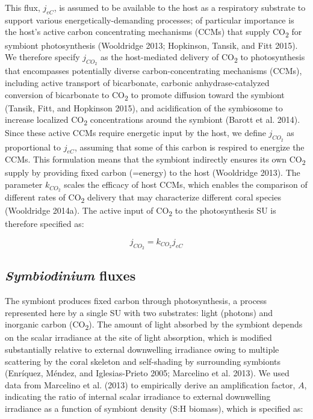 \documentclass[]{elsarticle} %
\begin{document}
This flux, \(j_{eC}\), is assumed to be available to the host as a
respiratory substrate to support various energetically-demanding
processes; of particular importance is the host's active carbon
concentrating mechanisms (CCMs) that supply CO\textsubscript{2} for
symbiont photosynthesis (Wooldridge 2013; Hopkinson, Tansik, and Fitt
2015). We therefore specify \(j_{CO_2}\) as the host-mediated delivery
of CO\textsubscript{2} to photosynthesis that encompasses potentially
diverse carbon-concentrating mechanisms (CCMs), including active
transport of bicarbonate, carbonic anhydrase-catalyzed conversion of
bicarbonate to CO\textsubscript{2} to promote diffusion toward the
symbiont (Tansik, Fitt, and Hopkinson 2015), and acidification of the
symbiosome to increase localized CO\textsubscript{2} concentrations
around the symbiont (Barott et al. 2014). Since these active CCMs
require energetic input by the host, we define \(j_{CO_2}\) as
proportional to \(j_{eC}\), assuming that some of this carbon is
respired to energize the CCMs. This formulation means that the symbiont
indirectly ensures its own CO\textsubscript{2} supply by providing fixed
carbon (=energy) to the host (Wooldridge 2013). The parameter
\(k_{CO_2}\) scales the efficacy of host CCMs, which enables the
comparison of different rates of CO\textsubscript{2} delivery that may
characterize different coral species (Wooldridge 2014a). The active
input of CO\textsubscript{2} to the photosynthesis SU is therefore
specified as:

\begin{equation} j_{CO_2} = k_{CO_2}j_{eC} \end{equation}

\subsection{\texorpdfstring{\emph{Symbiodinium}
fluxes}{Symbiodinium fluxes}}\label{symbiodinium-fluxes}

The symbiont produces fixed carbon through photosynthesis, a process
represented here by a single SU with two substrates: light (photons) and
inorganic carbon (CO\textsubscript{2}). The amount of light absorbed by
the symbiont depends on the scalar irradiance at the site of light
absorption, which is modified substantially relative to external
downwelling irradiance owing to multiple scattering by the coral
skeleton and self-shading by surrounding symbionts (Enríquez, Méndez,
and Iglesias-Prieto 2005; Marcelino et al. 2013). We used data from
Marcelino et al. (2013) to empirically derive an amplification factor,
\(A\), indicating the ratio of internal scalar irradiance to external
downwelling irradiance as a function of symbiont density (S:H biomass),
which is specified as:
\end{document}
